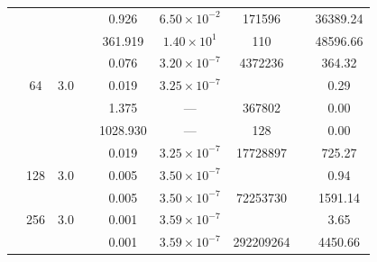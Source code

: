 \begin{table}[htbp]
\begin{tabular}{l S[table-format=3.0] S[table-format=4.1] l S[table-format=3.3] S[table-format=1.2e2] S[table-format=6.0] S[table-format=2.0] S[table-format=4.2]}
     &  &  &  & 0.926 & $6.50 \times 10^{-2}$ & 171596 & {\text{---}} & 36389.24 \\
     &  &  &  & 361.919 & $1.40 \times 10^{1}$ & 110 & {\text{---}} & 48596.66 \\
     &  &  &  & 0.076 & $3.20 \times 10^{-7}$ & 4372236 & {\text{---}} & 364.32 \\
     & 64 & 3.0 &  & 0.019 & $3.25 \times 10^{-7}$ & {\text{---}} & {\text{---}} & 0.29 \\
     &  &  &  & 1.375 & ${\text{---}}$ & 367802 & {\text{---}} & 0.00 \\
     &  &  &  & 1028.930 & ${\text{---}}$ & 128 & {\text{---}} & 0.00 \\
     &  &  &  & 0.019 & $3.25 \times 10^{-7}$ & 17728897 & {\text{---}} & 725.27 \\
     & 128 & 3.0 &  & 0.005 & $3.50 \times 10^{-7}$ & {\text{---}} & {\text{---}} & 0.94 \\
     &  &  &  & 0.005 & $3.50 \times 10^{-7}$ & 72253730 & {\text{---}} & 1591.14 \\
     & 256 & 3.0 &  & 0.001 & $3.59 \times 10^{-7}$ & {\text{---}} & {\text{---}} & 3.65 \\
     &  &  &  & 0.001 & $3.59 \times 10^{-7}$ & 292209264 & {\text{---}} & 4450.66 \\
    \bottomrule
  \end{tabular}
\end{table}
